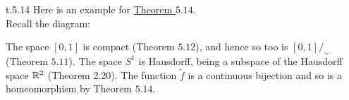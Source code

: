 \begin{customexa}{t.5.14} Here is an example for \hypertarget{ex.t.5.14}{\hyperlink{Theorem_5.14}{Theorem $5.14$}}.\\
Recall the diagram:
\begin{center}
\end{center}
The space $[0,1]$ is compact (Theorem $5.12$), and hence so too is $[0, 1]/_{\sim}$ (Theorem $5.11$). The space $S^1$ is Hausdorff, being a subspace of the Hausdorff space $\mathbb{R}^2$ (Theorem 2.20). The function $\widetilde{f}$ is a continuous bijection and so is a homeomorphism by Theorem $5.14$.

\end{customexa}